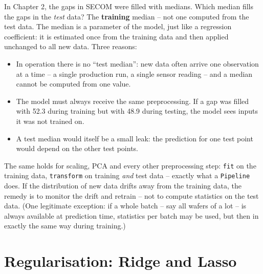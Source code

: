 \documentclass[
  letterpaper,
  DIV=11,
  numbers=noendperiod]{scrreprt}
\providecommand{\tightlist}{%
  \setlength{\itemsep}{0pt}\setlength{\parskip}{0pt}}\usepackage{longtable,booktabs,array}
\begin{document}
\begin{tcolorbox}[enhanced jigsaw, left=2mm, title=\textcolor{quarto-callout-tip-color}{\faLightbulb}\hspace{0.5em}{Engineering practice: one median for training and test data}, opacityback=0, breakable, rightrule=.15mm, arc=.35mm, toptitle=1mm, colbacktitle=quarto-callout-tip-color!10!white, opacitybacktitle=0.6, coltitle=black, colframe=quarto-callout-tip-color-frame, bottomrule=.15mm, leftrule=.75mm, bottomtitle=1mm, titlerule=0mm, toprule=.15mm, colback=white]

In Chapter 2, the gaps in SECOM were filled with medians. Which median
fills the gaps in the \emph{test} data? The \textbf{training} median --
not one computed from the test data. The median is a parameter of the
model, just like a regression coefficient: it is estimated once from the
training data and then applied unchanged to all new data. Three reasons:

\begin{itemize}
\tightlist
\item
  In operation there is no ``test median'': new data often arrive one
  observation at a time -- a single production run, a single sensor
  reading -- and a median cannot be computed from one value.
\item
  The model must always receive the same preprocessing. If a gap was
  filled with 52.3 during training but with 48.9 during testing, the
  model sees inputs it was not trained on.
\item
  A test median would itself be a small leak: the prediction for one
  test point would depend on the other test points.
\end{itemize}

The same holds for scaling, PCA and every other preprocessing step:
\texttt{fit} on the training data, \texttt{transform} on training
\emph{and} test data -- exactly what a \texttt{Pipeline} does. If the
distribution of new data drifts away from the training data, the remedy
is to monitor the drift and retrain -- not to compute statistics on the
test data. (One legitimate exception: if a whole batch -- say all wafers
of a lot -- is always available at prediction time, statistics per batch
may be used, but then in exactly the same way during training.)

\end{tcolorbox}

\section{Regularisation: Ridge and
Lasso}\label{regularisation-ridge-and-lasso}
\end{document}
